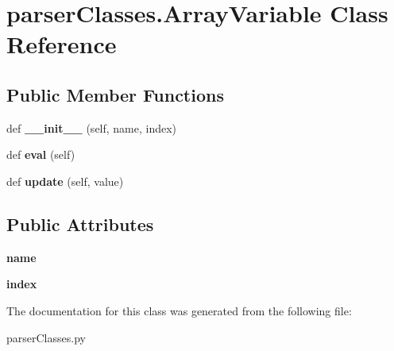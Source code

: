 \hypertarget{classparser_classes_1_1_array_variable}{}\section{parser\+Classes.\+Array\+Variable Class Reference}
\label{classparser_classes_1_1_array_variable}
\subsection*{Public Member Functions}
\begin{DoxyCompactItemize}
\item 
def {\bfseries \+\_\+\+\_\+init\+\_\+\+\_\+} (self, name, index)\hypertarget{classparser_classes_1_1_array_variable_afb6239db909b44d7ad42b79f1d89786d}{}\label{classparser_classes_1_1_array_variable_afb6239db909b44d7ad42b79f1d89786d}

\item 
def {\bfseries eval} (self)\hypertarget{classparser_classes_1_1_array_variable_a6c61b9b50fcaa606cc08af21d7f5778d}{}\label{classparser_classes_1_1_array_variable_a6c61b9b50fcaa606cc08af21d7f5778d}

\item 
def {\bfseries update} (self, value)\hypertarget{classparser_classes_1_1_array_variable_ae8068e5174714d900498f024a7933dca}{}\label{classparser_classes_1_1_array_variable_ae8068e5174714d900498f024a7933dca}

\end{DoxyCompactItemize}
\subsection*{Public Attributes}
\begin{DoxyCompactItemize}
\item 
{\bfseries name}\hypertarget{classparser_classes_1_1_array_variable_ad2e8e2f71b9333f55813166ae953e12e}{}\label{classparser_classes_1_1_array_variable_ad2e8e2f71b9333f55813166ae953e12e}

\item 
{\bfseries index}\hypertarget{classparser_classes_1_1_array_variable_a3a084b5d13c1e75b841842fe5bbf04c6}{}\label{classparser_classes_1_1_array_variable_a3a084b5d13c1e75b841842fe5bbf04c6}

\end{DoxyCompactItemize}


The documentation for this class was generated from the following file\+:\begin{DoxyCompactItemize}
\item 
parser\+Classes.\+py\end{DoxyCompactItemize}
